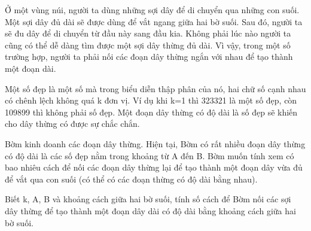 Ở một vùng núi, người ta dùng những sợi dây để di chuyển qua những con suối. Một sợi dây đủ dài sẽ được dùng để vắt ngang giữa hai bờ suối. Sau đó, người ta sẽ đu dây để di chuyển từ đầu này sang đầu kia. Không phải lúc nào người ta cũng có thể dễ dàng tìm được một sợi dây thừng đủ dài. Vì vậy, trong một số trường hợp, người ta phải nối các đoạn dây thừng ngắn với nhau để tạo thành một đoạn dài.  

   Một số đẹp là một số mà trong biểu diễn thập phân của nó, hai chữ số cạnh nhau có chênh lệch không quá k đơn vị. Ví dụ khi k=1 thì 323321 là một số đẹp, còn 109899 thì không phải số đẹp. Một đoạn dây thừng có độ dài là số đẹp sẽ khiến cho dây thừng có được sự chắc chắn.  

   Bờm kinh doanh các đoạn dây thừng. Hiện tại, Bờm có rất nhiều đoạn dây thừng có độ dài là các số đẹp nằm trong khoảng từ A đến B. Bờm muốn tính xem có bao nhiêu cách để nối các đoạn dây thừng lại để tạo thành một đoạn dây vừa đủ để vắt qua con suối (có thể có các đoạn thừng có độ dài bằng nhau).  

   Biết k, A, B và khoảng cách giữa hai bờ suối, tính số cách để Bờm nối các sợi dây thừng để tạo thành một đoạn dây dài có độ dài bằng khoảng cách giữa hai bờ suối.